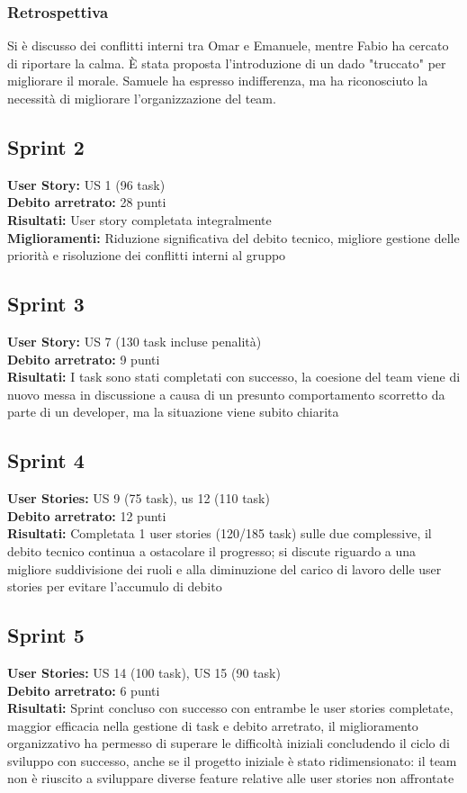 \documentclass{article}
\begin{document}
\subsubsection*{Retrospettiva}  
Si è discusso dei conflitti interni tra Omar e Emanuele, mentre Fabio ha cercato di riportare la calma. È stata proposta l'introduzione di un dado "truccato" per migliorare il morale. Samuele ha espresso indifferenza, ma ha riconosciuto la necessità di migliorare l’organizzazione del team.


\subsection*{Sprint 2}
\textbf{User Story:} US 1 (96 task)\\
\textbf{Debito arretrato:} 28 punti\\
\textbf{Risultati:} User story completata integralmente\\
\textbf{Miglioramenti:} Riduzione significativa del debito tecnico, migliore gestione delle priorità e risoluzione dei conflitti interni al gruppo

\subsection*{Sprint 3}
\textbf{User Story:} US 7 (130 task incluse penalità)\\
\textbf{Debito arretrato:} 9 punti\\
\textbf{Risultati:} I task sono stati completati con successo, la coesione del team viene di nuovo messa in discussione a causa di un presunto comportamento scorretto da parte di un developer, ma la situazione viene subito chiarita

\subsection*{Sprint 4}
\textbf{User Stories:} US 9 (75 task), us 12 (110 task)\\
\textbf{Debito arretrato:} 12 punti\\
\textbf{Risultati:} Completata 1 user stories (120/185 task) sulle due complessive, il debito tecnico continua a ostacolare il progresso; si discute riguardo a una migliore suddivisione dei ruoli e alla diminuzione del carico di lavoro delle user stories per evitare l'accumulo di debito

\subsection*{Sprint 5}
\textbf{User Stories:} US 14 (100 task), US 15 (90 task)\\
\textbf{Debito arretrato:} 6 punti\\
\textbf{Risultati:} Sprint concluso con successo con entrambe le user stories completate, maggior efficacia nella gestione di task e debito arretrato, il miglioramento organizzativo ha permesso di superare le difficoltà iniziali concludendo il ciclo di sviluppo con successo, anche se il progetto iniziale è stato ridimensionato: il team non è riuscito a sviluppare diverse feature relative alle user stories non affrontate
\end{document}
